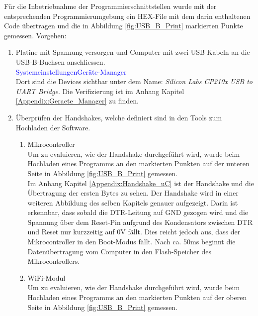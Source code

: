 
Für die Inbetriebnahme der Programmierschnittstellen wurde mit der entsprechenden Programmierumgebung ein HEX-File mit dem darin enthaltenen Code übertragen und die in Abbildung \ref{fig:USB_B_Print} markierten Punkte gemessen.
\newpage
Vorgehen:

\begin{enumerate}
\item Platine mit Spannung versorgen und Computer mit zwei USB-Kabeln an die USB-B-Buchsen anschliessen.\\
\textcolor{blue}{Systemeinstellungen\textrightarrow Geräte-Manager}\\
Dort sind die Devices sichtbar unter dem Name: \textit{Silicon Labs CP210x USB to UART Bridge}. Die Verifizierung ist im Anhang Kapitel \ref{Appendix:Geraete_Manager} zu finden.\newline
\item Überprüfen der Handshakes, welche definiert sind in den Tools zum Hochladen der Software.\\

\begin{enumerate}
\item Mikrocontroller\\

Um zu evaluieren, wie der Handshake durchgeführt wird, wurde beim Hochladen eines Programms an den markierten Punkten auf der unteren Seite in Abbildung \ref{fig:USB_B_Print} gemessen.\\

Im Anhang Kapitel \ref{Appendix:Handshake_uC} ist der Handshake und die Übertragung der ersten Bytes zu sehen. Der Handshake wird in einer weiteren Abbildung des selben Kapitels genauer aufgezeigt. Darin ist erkennbar, dass sobald die DTR-Leitung auf GND gezogen wird und die Spannung über dem Reset-Pin aufgrund des Kondensators zwischen DTR und Reset nur kurzzeitig auf 0V fällt. Dies reicht jedoch aus, dass der Mikrocontroller in den Boot-Modus fällt. Nach ca. 50ms beginnt die Datenübertragung vom Computer in den Flash-Speicher des Mikrocontrollers.\\

\item WiFi-Modul\\

Um zu evaluieren, wie der Handshake durchgeführt wird, wurde beim Hochladen eines Programms an den markierten Punkten auf der oberen Seite in Abbildung \ref{fig:USB_B_Print} gemessen.\\


\end{enumerate}
\end{enumerate}
